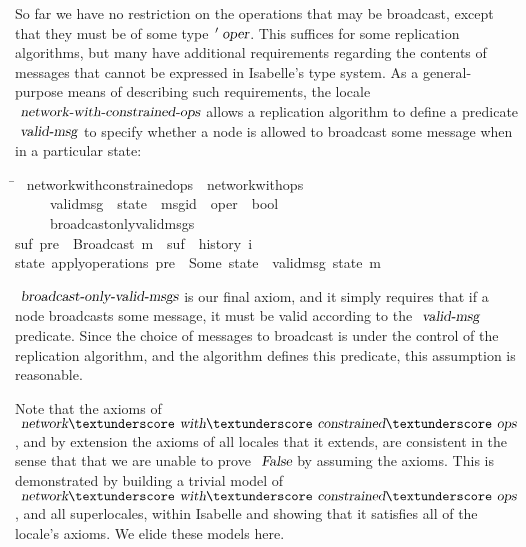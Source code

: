 So far we have no restriction on the operations that may be broadcast, except that they must be of some type $\isacharprime\isa{oper}$.
This suffices for some replication algorithms, but many have additional requirements regarding the contents of messages that cannot be expressed in Isabelle's type system.
As a general-purpose means of describing such requirements, the locale $\isa{network-with-constrained-ops}$ allows a replication algorithm to define a predicate $\isa{valid-msg}$ to specify whether a node is allowed to broadcast some message when in a particular state:
\begin{isabelle}
\hspace{6em}\=\kill
{}\ network{\isacharunderscore}with{\isacharunderscore}constrained{\isacharunderscore}ops\ {\isacharequal}\ network{\isacharunderscore}with{\isacharunderscore}ops\ {\isacharplus}\\
~~~~\ valid{\isacharunderscore}msg\ {\isacharcolon}{\isacharcolon}\ {\isachardoublequoteopen}{\isacharprime}state\ {\isasymRightarrow}\ {\isacharparenleft}{\isacharprime}msgid\ {\isasymtimes}\ {\isacharprime}oper{\isacharparenright}\ {\isasymRightarrow}\ bool{\isachardoublequoteclose}\\
~~~~\ broadcast{\isacharunderscore}only{\isacharunderscore}valid{\isacharunderscore}msgs{\isacharcolon}\\
\>{\isachardoublequoteopen}{\isasymexists}suf{\isachardot}\ pre\ {\isacharat}\ {\isacharbrackleft}Broadcast\ m{\isacharbrackright}\ {\isacharat}\ suf\ {\isacharequal}\ history\ i\ {\isasymLongrightarrow}\\
\>{\isasymexists}state{\isachardot}\ apply{\isacharunderscore}operations\ pre\ {\isacharequal}\ Some\ state\ {\isasymand}\ valid{\isacharunderscore}msg\ state\ m{\isachardoublequoteclose}
\end{isabelle}

$\isa{broadcast-only-valid-msgs}$ is our final axiom, and it simply requires that if a node broadcasts some message, it must be valid according to the $\isa{valid-msg}$ predicate.
Since the choice of messages to broadcast is under the control of the replication algorithm, and the algorithm defines this predicate, this assumption is reasonable.

Note that the axioms of $\isa{network}{\isacharunderscore}\isa{with}{\isacharunderscore}\isa{constrained}{\isacharunderscore}\isa{ops}$, and by extension the axioms of all locales that it extends, are consistent in the sense that that we are unable to prove $\isa{False}$ by assuming the axioms.
This is demonstrated by building a trivial model of $\isa{network}{\isacharunderscore}\isa{with}{\isacharunderscore}\isa{constrained}{\isacharunderscore}\isa{ops}$, and all superlocales, within Isabelle and showing that it satisfies all of the locale's axioms.
We elide these models here.

